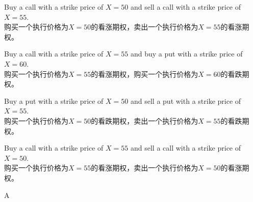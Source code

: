 \documentclass{article}
\begin{document}
    \begin{choices}
        \item Buy a call with a strike price of \(X = 50\) and sell a call with a strike price of \(X = 55\).\\
        购买一个执行价格为\(X = 50\)的看涨期权，卖出一个执行价格为\(X = 55\)的看涨期权。
        \item Buy a call with a strike price of \(X = 55\) and buy a put with a strike price of \(X = 60\).\\
        购买一个执行价格为\(X = 55\)的看涨期权，购买一个执行价格为\(X = 60\)的看跌期权。
        \item Buy a put with a strike price of \(X = 50\) and sell a put with a strike price of \(X = 55\).\\
        购买一个执行价格为\(X = 50\)的看跌期权，卖出一个执行价格为\(X = 55\)的看跌期权。
        \item Buy a call with a strike price of \(X = 55\) and sell a call with a strike price of \(X = 50\).\\
        购买一个执行价格为\(X = 55\)的看涨期权，卖出一个执行价格为\(X = 50\)的看涨期权。
    \end{choices}
    
    \begin{correctanswer}
    A
    \end{correctanswer}
    
\end{document}
